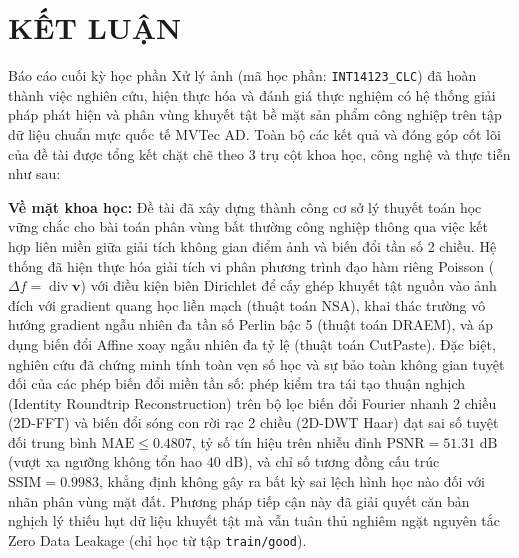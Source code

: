 \chapter*{KẾT LUẬN}

Báo cáo cuối kỳ học phần Xử lý ảnh (mã học phần: \texttt{INT14123\_CLC}) đã hoàn thành việc nghiên cứu, hiện thực hóa và đánh giá thực nghiệm có hệ thống giải pháp phát hiện và phân vùng khuyết tật bề mặt sản phẩm công nghiệp trên tập dữ liệu chuẩn mực quốc tế MVTec AD. Toàn bộ các kết quả và đóng góp cốt lõi của đề tài được tổng kết chặt chẽ theo 3 trụ cột khoa học, công nghệ và thực tiễn như sau:

\textbf{Về mặt khoa học:} Đề tài đã xây dựng thành công cơ sở lý thuyết toán học vững chắc cho bài toán phân vùng bất thường công nghiệp thông qua việc kết hợp liên miền giữa giải tích không gian điểm ảnh và biến đổi tần số 2 chiều. Hệ thống đã hiện thực hóa giải tích vi phân phương trình đạo hàm riêng Poisson ($\Delta f = \operatorname{div}\mathbf{v}$) với điều kiện biên Dirichlet để cấy ghép khuyết tật nguồn vào ảnh đích với gradient quang học liền mạch (thuật toán NSA), khai thác trường vô hướng gradient ngẫu nhiên đa tần số Perlin bậc 5 (thuật toán DRAEM), và áp dụng biến đổi Affine xoay ngẫu nhiên đa tỷ lệ (thuật toán CutPaste). Đặc biệt, nghiên cứu đã chứng minh tính toàn vẹn số học và sự bảo toàn không gian tuyệt đối của các phép biến đổi miền tần số: phép kiểm tra tái tạo thuận nghịch (Identity Roundtrip Reconstruction) trên bộ lọc biến đổi Fourier nhanh 2 chiều (2D-FFT) và biến đổi sóng con rời rạc 2 chiều (2D-DWT Haar) đạt sai số tuyệt đối trung bình $\text{MAE} \le 0.4807$, tỷ số tín hiệu trên nhiễu đỉnh $\text{PSNR} = 51.31\text{ dB}$ (vượt xa ngưỡng không tổn hao $40\text{ dB}$), và chỉ số tương đồng cấu trúc $\text{SSIM} = 0.9983$, khẳng định không gây ra bất kỳ sai lệch hình học nào đối với nhãn phân vùng mặt đất. Phương pháp tiếp cận này đã giải quyết căn bản nghịch lý thiếu hụt dữ liệu khuyết tật mà vẫn tuân thủ nghiêm ngặt nguyên tắc Zero Data Leakage (chỉ học từ tập \texttt{train/good}).

